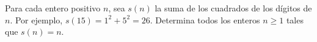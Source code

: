 Para cada entero positivo $n$, sea $s(n)$ la suma de los cuadrados de los dígitos de $n$. Por ejemplo, $s(15) = 1^2 + 5^2 = 26$. Determina todos los enteros $n \geq 1$ tales que $s(n) = n$.

